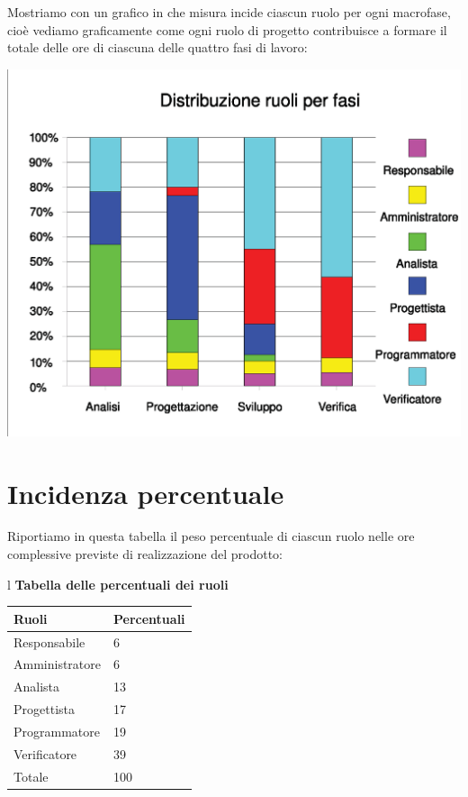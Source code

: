 \documentclass[11pt,titlepage,a4paper]{report}
\begin{document}
Mostriamo con un grafico in che misura incide ciascun ruolo per ogni macrofase,
cio\`e vediamo graficamente come ogni ruolo di progetto contribuisce a formare 
il totale delle ore di ciascuna delle quattro fasi di lavoro:
\begin{center}
\includegraphics [width=1\textwidth] {ruoliperFasi.eps}
\end{center}

\section{Incidenza percentuale}
Riportiamo in questa tabella il peso percentuale di ciascun ruolo nelle ore
complessive previste di realizzazione del prodotto:
\begin{table}[hbtp]
\large{
\begin{tabular}{l}
\Large{\textbf{\textsf{Tabella delle percentuali dei ruoli}}} \\
\begin{tabular}{||p{6cm}||p{4cm}||}
\hline
\textbf{Ruoli} & \textbf{Percentuali}\\ \hline
{Responsabile}&6\\ \hline 
{Amministratore} &6\\ \hline
{Analista} &13 \\ \hline
{Progettista} &17\\ \hline
{Programmatore} &19\\ \hline
{Verificatore} &39 \\ \hline
{Totale} &100 \\ \hline
\end{tabular} \\
\end{tabular}
}
\end{table}
\end{document}
